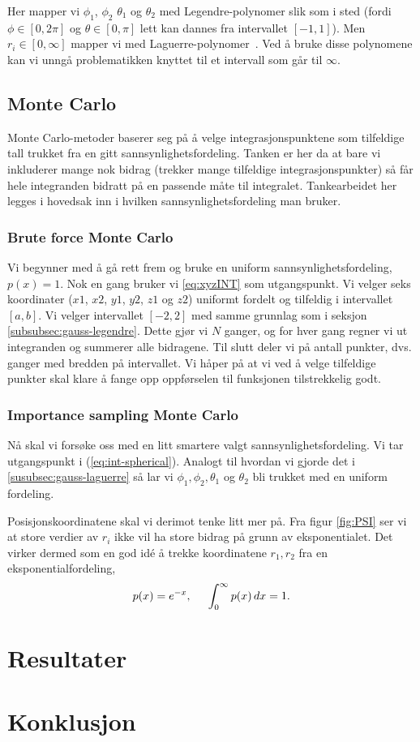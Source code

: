 \documentclass[11pt]{article}
\begin{document}
Her mapper vi $\phi_1$, $\phi_2$ $\theta_1$ og $\theta_2$ med
Legendre-polynomer slik som i sted (fordi $\phi\in[0,2\pi]$ og
$\theta\in[0,\pi]$ lett kan dannes fra intervallet $[-1,1]$).
Men $ r_i \in [0, \infty] $ mapper vi med
Laguerre-polynomer~\cite{Lecture-notes}. Ved å bruke disse polynomene
kan vi unngå problematikken knyttet til et intervall som går til $\infty$.


\subsection{Monte Carlo}
\label{subsec:monte-carlo}
Monte Carlo-metoder baserer seg på å velge integrasjonspunktene som
tilfeldige tall trukket fra en gitt sannsynlighetsfordeling. Tanken er
her da at bare vi inkluderer mange nok bidrag (trekker mange
tilfeldige integrasjonspunkter) så får hele integranden bidratt på en
passende måte til integralet. Tankearbeidet her legges i hovedsak inn
i hvilken sannsynlighetsfordeling man bruker.

\subsubsection{Brute force Monte Carlo}
\label{subsubsec:monte-carlo-uniform}
Vi begynner med å gå rett frem og bruke en uniform
sannsynlighetsfordeling, $p(x) = 1$. Nok en gang bruker vi
\eqref{eq:xyzINT} som utgangspunkt. Vi velger seks koordinater ($x1$,
$x2$, $y1$, $y2$, $z1$ og $z2$) uniformt fordelt og tilfeldig i
intervallet $[a,b]$. Vi velger intervallet $[-2,2]$ med samme grunnlag
som i seksjon \ref{subsubsec:gauss-legendre}. Dette gjør vi $N$ ganger, og for hver gang regner
vi ut integranden og summerer alle bidragene. Til slutt deler vi på
antall punkter, dvs. ganger med bredden på intervallet. Vi håper på
at vi ved å velge tilfeldige punkter skal klare å fange opp
oppførselen til funksjonen tilstrekkelig godt.

\subsubsection{Importance sampling Monte Carlo}
\label{susubsec:monte-carlo-importance-sampling}
Nå skal vi forsøke oss med en litt smartere valgt
sannsynlighetsfordeling. Vi tar utgangspunkt i
(\ref{eq:int-spherical}). Analogt til hvordan vi gjorde det i
\ref{susubsec:gauss-laguerre} så lar vi $\phi_1,\phi_2,\theta_1$ og
$\theta_2$ bli trukket med en uniform fordeling.

Posisjonskoordinatene skal vi derimot tenke litt mer på. Fra figur
\ref{fig:PSI} ser vi at store verdier av $r_i$ ikke vil ha store
bidrag på grunn av eksponentialet. Det virker dermed som en god idé å
trekke koordinatene $r_1,r_2$ fra en eksponentialfordeling,
\begin{align}
  p(x) = e^{-x},\hspace{0.5cm}\int_0^\infty p(x)\,dx=1.\label{eq:exponential-prob}
\end{align}

\section{Resultater}

\section{Konklusjon}



\printbibliography
\end{document}
